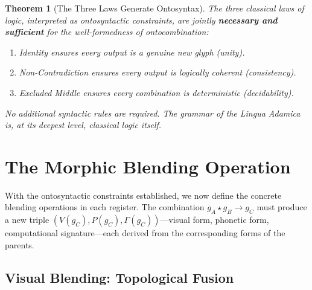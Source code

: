 \documentclass[12pt, letterpaper]{book}
\def\mathfrak#1{#1}%
\newtheorem{theorem}{Theorem}[chapter]
\begin{document}
\begin{theorem}[The Three Laws Generate Ontosyntax]
The three classical laws of logic, interpreted as ontosyntactic constraints, are jointly \textbf{necessary and sufficient} for the well-formedness of ontocombination:
\begin{enumerate}[label=(\roman*)]
    \item Identity ensures every output is a genuine new glyph (unity).
    \item Non-Contradiction ensures every output is logically coherent (consistency).
    \item Excluded Middle ensures every combination is deterministic (decidability).
\end{enumerate}
No additional syntactic rules are required. The grammar of the Lingua Adamica is, at its deepest level, \textit{classical logic itself}.
\end{theorem}


\section{The Morphic Blending Operation}

With the ontosyntactic constraints established, we now define the concrete blending operations in each register. The combination $\mathfrak{g}_A \star \mathfrak{g}_B \to \mathfrak{g}_C$ must produce a new triple $(V(\mathfrak{g}_C), P(\mathfrak{g}_C), \Gamma(\mathfrak{g}_C))$---visual form, phonetic form, computational signature---each derived from the corresponding forms of the parents.

\subsection{Visual Blending: Topological Fusion}
\end{document}
